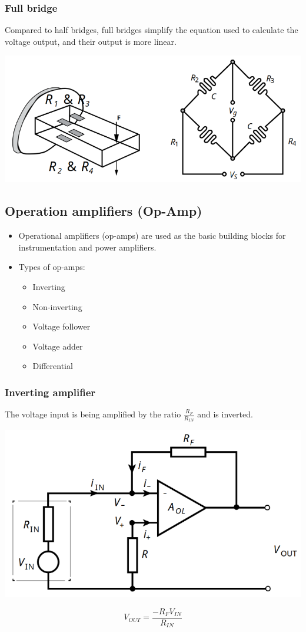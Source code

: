 \documentclass[11pt]{article}
\begin{document}
\subsubsection{Full bridge}
\label{sec:org0b54b8b}
Compared to half bridges, full bridges simplify the equation used to calculate the voltage output, and their output is more linear.
\begin{center}
\includegraphics[width=.9\linewidth]{./images/full-bridge-deflection-bridge.png}
\end{center}

 \newpage

\subsection{Operation amplifiers (Op-Amp)}
\label{sec:orgf498442}
\begin{itemize}
\item Operational amplifiers (op-amps) are used as the basic building blocks for instrumentation and power amplifiers.
\item Types of op-amps:
\begin{itemize}
\item Inverting
\item Non-inverting
\item Voltage follower
\item Voltage adder
\item Differential
\end{itemize}
\end{itemize}

\subsubsection{Inverting amplifier}
\label{sec:orgc74010f}
The voltage input is being amplified by the ratio \(\frac{R_F}{R_{IN}}\) and is inverted.
\begin{center}
\includegraphics[width=.9\linewidth]{./images/inverting-amplifier.png}
\end{center}
\[V_{OUT} = \frac{-R_F V_{IN}}{R_{IN}}\]
\end{document}
